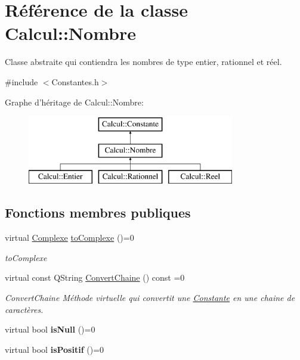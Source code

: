 \hypertarget{class_calcul_1_1_nombre}{\section{Référence de la classe Calcul\-:\-:Nombre}
\label{class_calcul_1_1_nombre}
}


Classe abstraite qui contiendra les nombres de type entier, rationnel et réel.  




{\ttfamily \#include $<$Constantes.\-h$>$}

Graphe d'héritage de Calcul\-:\-:Nombre\-:\begin{figure}[H]
\begin{center}
\leavevmode
\includegraphics[height=3.000000cm]{class_calcul_1_1_nombre}
\end{center}
\end{figure}
\subsection*{Fonctions membres publiques}
\begin{DoxyCompactItemize}
\item 
virtual \hyperlink{class_calcul_1_1_complexe}{Complexe} \hyperlink{class_calcul_1_1_nombre_a01b0c03ea3d7493e6d853768cce6f096}{to\-Complexe} ()=0
\begin{DoxyCompactList}\small\item\em to\-Complexe \end{DoxyCompactList}\item 
virtual const Q\-String \hyperlink{class_calcul_1_1_nombre_aa2a937e5d718f73f0edf25b702c11551}{Convert\-Chaine} () const =0
\begin{DoxyCompactList}\small\item\em Convert\-Chaine Méthode virtuelle qui convertit une \hyperlink{class_calcul_1_1_constante}{Constante} en une chaine de caractères. \end{DoxyCompactList}\item 
\hypertarget{class_calcul_1_1_nombre_a2e01e325172c362791e52f9c5e7058f5}{virtual bool {\bfseries is\-Null} ()=0}\label{class_calcul_1_1_nombre_a2e01e325172c362791e52f9c5e7058f5}

\item 
\hypertarget{class_calcul_1_1_nombre_a2b41e493c8f0319ceb8de041f8759dfb}{virtual bool {\bfseries is\-Positif} ()=0}\label{class_calcul_1_1_nombre_a2b41e493c8f0319ceb8de041f8759dfb}

\end{DoxyCompactItemize}


